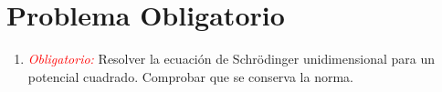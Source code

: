 \documentclass[12pt,spanish]{iopart}
\def\ro{\textcolor{red}}
\newcommand{\bc}{\begin{center}}
\newcommand{\ec}{\end{center}}
\begin{document}



%

\section{Problema Obligatorio}
\begin{enumerate}
\item{\ro{\it Obligatorio:}} Resolver la ecuaci{\'o}n de Schr\"odinger unidimensional para un potencial cuadrado. Comprobar que se conserva la norma. 
\end{enumerate}
\end{document}
